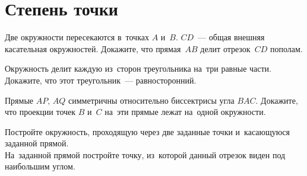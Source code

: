 
\section*{Степень точки}


\begin{problems}

\item
Две окружности пересекаются в~точках $A$ и~$B$.
$CD$~--- общая внешняя касательная окружностей.
Докажите, что прямая~$AB$ делит отрезок~$CD$ пополам.

\item
Окружность делит каждую из~сторон треугольника на~три равные части.
Докажите, что этот треугольник~--- равносторонний.

\item
Прямые $AP$, $AQ$ симметричны относительно биссектрисы угла $BAC$.
Докажите, что проекции точек $B$ и~$C$ на~эти прямые лежат на~одной окружности.

\item
\subproblem
Постройте окружность, проходящую через две заданные точки и~касающуюся заданной
прямой.
\\
\subproblem
На~заданной прямой постройте точку, из~которой данный отрезок виден под
наибольшим углом.

\end{problems}

